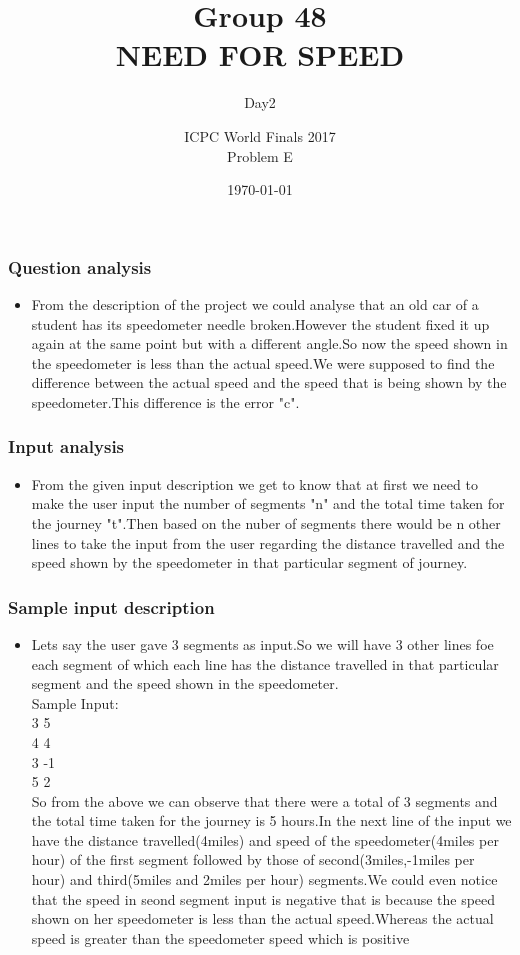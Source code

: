 \documentclass{beamer}
\title{Group 48 \\ NEED FOR SPEED}
\subtitle{Day2}
\date{\today}
\author{ICPC World Finals 2017 \\ Problem E}
\begin{document}
    
    \begin{frame}
	    \titlepage
    \end{frame}
    
    \begin{frame}
	    \frametitle{Question analysis}

	    \begin{itemize}
	    	\item From the description of the project we could analyse that an old car of a student has its speedometer needle broken.However the student fixed it up again at the same point but with a different angle.So now the speed shown in the speedometer is less than the actual speed.We were supposed to find the difference between the actual speed and the speed that is being shown by the speedometer.This difference is the error "c". 
	    \end{itemize}
    \end{frame}
    
    \begin{frame}
	    \frametitle{Input analysis}
	    \begin{itemize}
		\item From the given input description we get to know that at first we need to make the user input the number of segments "n" and the total time taken for the journey "t".Then based on the nuber of segments there would be n other lines to take the input from the user regarding the distance travelled and the speed shown by the speedometer in that particular segment of journey. 
	    \end{itemize}
    \end{frame}

    \begin{frame}
	    \frametitle{Sample input description}
	    \begin{itemize}
	    	\item Lets say the user gave 3 segments as input.So we will have 3 other lines foe each segment of which each line has the distance travelled in that particular segment and the speed shown in the speedometer.\\Sample Input:\\3 5\\4 4\\3 -1\\5 2\\
So from the above we can observe that there were a total of 3 segments and the total time taken for the journey is 5 hours.In the next line of the input we have the distance travelled(4miles) and speed of the speedometer(4miles per hour) of the first segment followed by those of second(3miles,-1miles per hour) and third(5miles and 2miles per hour) segments.We could even notice that the speed in seond segment input is negative that is because the speed shown on her speedometer is less than the actual speed.Whereas the actual speed is greater than the speedometer speed which is positive	    
	    \end{itemize}
    \end{frame}
\end{document}
